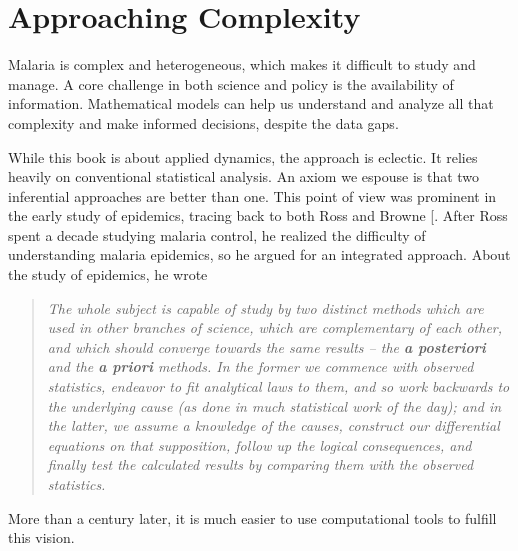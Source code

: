 \documentclass[
]{book}
\begin{document}
\section{Approaching Complexity}\label{approaching-complexity}

Malaria is complex and heterogeneous, which makes it difficult to study and manage. A core challenge in both science and policy is the availability of information. Mathematical models can help us understand and analyze all that complexity and make informed decisions, despite the data gaps.

While this book is about applied dynamics, the approach is eclectic. It relies heavily on conventional statistical analysis. An axiom we espouse is that two inferential approaches are better than one. This point of view was prominent in the early study of epidemics, tracing back to both Ross and Browne {[}\citeproc{ref-FinePEM1975RossPriori}{52}{]}. After Ross spent a decade studying malaria control, he realized the difficulty of understanding malaria epidemics, so he argued for an integrated approach. About the study of epidemics, he wrote

\begin{quote}
\emph{The whole subject is capable of study by two distinct methods which are used in other branches of science, which are complementary of each other, and which should converge towards the same results -- the \textbf{a posteriori} and the \textbf{a priori} methods. In the former we commence with observed statistics, endeavor to fit analytical laws to them, and so work backwards to the underlying cause (as done in much statistical work of the day); and in the latter, we assume a knowledge of the causes, construct our differential equations on that supposition, follow up the logical consequences, and finally test the calculated results by comparing them with the observed statistics.}
\end{quote}

More than a century later, it is much easier to use computational tools to fulfill this vision.
\end{document}
